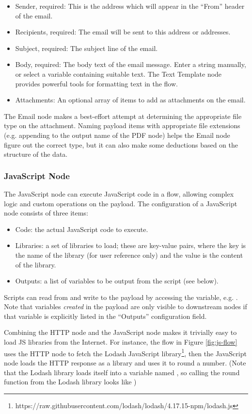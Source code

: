 \begin{itemize}
\item Sender, required: This is the address which will appear in the ``From'' header of the email.
\item Recipients, required: The email will be sent to this address or addresses.
\item Subject, required: The subject line of the email.
\item Body, required: The body text of the email message. Enter a string manually, or select a variable containing suitable text. The Text Template node provides powerful tools for formatting text in the flow.
\item Attachments: An optional array of items to add as attachments on the email.
\end{itemize}

The Email node makes a best-effort attempt at determining the appropriate file type on the attachment. Naming payload items with appropriate file extensions (e.g. appending  to the output name of the PDF node) helps the Email node figure out the correct type, but it can also make some deductions based on the structure of the data.

\subsubsection{JavaScript Node}
The JavaScript node can execute JavaScript code in a flow, allowing complex logic and custom operations on the payload. The configuration of a JavaScript node consists of three items:

\begin{itemize}
\item Code: the actual JavaScript code to execute.
\item Libraries: a set of libraries to load; these are key-value pairs, where the key is the name of the library (for user reference only) and the value is the content of the library.
\item Outputs: a list of variables to be output from the script (see below).
\end{itemize}

Scripts can read from and write to the payload by accessing the  variable, e.g. . Note that variables \emph{created} in the payload are only visible to downstream nodes if that variable is explicitly listed in the ``Outputs'' configuration field.

Combining the HTTP node and the JavaScript node makes it trivially easy to load JS libraries from the Internet. For instance, the flow in Figure \ref{fig:js-flow} uses the HTTP node to fetch the Lodash JavaScript library\footnote{https://raw.githubusercontent.com/lodash/lodash/4.17.15-npm/lodash.js}, then the JavaScript node loads the HTTP response as a library and uses it to round a number. (Note that the Lodash library loads itself into a variable named \code{\_}, so calling the round function from the Lodash library looks like )

